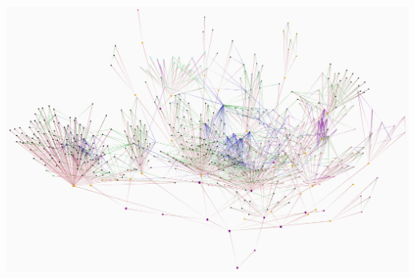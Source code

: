 \documentclass{beamer}
\begin{document}
\begin{frame}
    \vspace{1.5em}
    \begin{minipage}[t][2.5cm][c]{\textwidth}
    \centering
        \includegraphics[scale=0.13]{latinfar.png}
    \end{minipage}
\end{frame}
\end{document}
